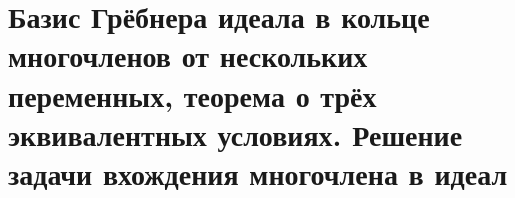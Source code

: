 \section{Базис Грёбнера идеала в кольце многочленов от нескольких переменных, теорема о трёх эквивалентных условиях. Решение задачи вхождения многочлена в идеал}